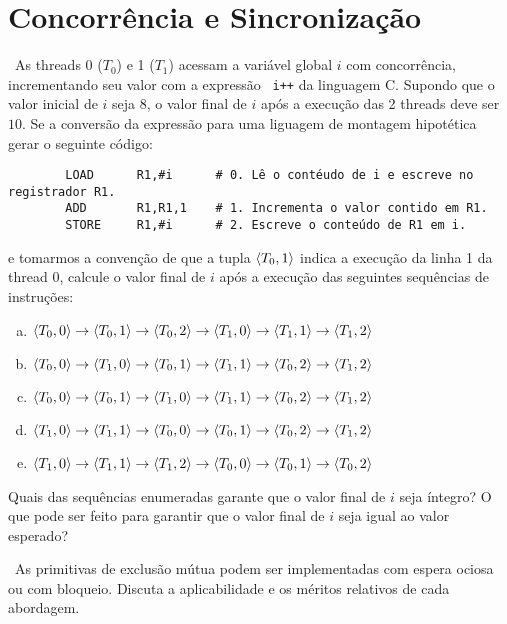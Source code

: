 
\section*{Concorrência e Sincronização}

\exercise~As threads 0 ($T_0$) e 1 ($T_1$) acessam a variável global
$i$ com concorrência, incrementando seu valor com a expressão {\tt
  i++} da linguagem C. Supondo que o valor inicial de $i$ seja $8$, o
valor final de $i$ após a execução das 2 threads deve ser $10$. Se a
conversão da expressão para uma liguagem de montagem hipotética gerar
o seguinte código:

\begin{verbatim}
        LOAD      R1,#i      # 0. Lê o contéudo de i e escreve no registrador R1.
        ADD       R1,R1,1    # 1. Incrementa o valor contido em R1.
        STORE     R1,#i      # 2. Escreve o conteúdo de R1 em i.
\end{verbatim}

\noindent e tomarmos a convenção de que a tupla $\<T_0,1>$ indica
a execução da linha 1 da thread 0, calcule o valor final de $i$ após a
execução das seguintes sequências de instruções:

\begin{enumerate}[a)]
\item $\<T_0,0> \rightarrow \<T_0,1> \rightarrow \<T_0,2>
\rightarrow\<T_1,0>\rightarrow\<T_1,1> \rightarrow\<T_1,2>$
\item $\<T_0,0> \rightarrow\<T_1,0> \rightarrow\<T_0,1>
\rightarrow\<T_1,1>\rightarrow\<T_0,2> \rightarrow\<T_1,2>$
\item $\<T_0,0>\rightarrow\<T_0,1> \rightarrow\<T_1,0>
\rightarrow\<T_1,1>\rightarrow\<T_0,2> \rightarrow\<T_1,2>$
\item $\<T_1,0>\rightarrow\<T_1,1> \rightarrow\<T_0,0>
\rightarrow\<T_0,1>\rightarrow\<T_0,2> \rightarrow\<T_1,2>$
\item $\<T_1,0>\rightarrow\<T_1,1>\rightarrow\<T_1,2>
\rightarrow\<T_0,0>\rightarrow\<T_0,1>\rightarrow\<T_0,2>$
\end{enumerate}

\noindent Quais das sequências enumeradas garante que o valor final de $i$ seja
íntegro? O que pode ser feito para garantir que o valor final de $i$
seja igual ao valor esperado?

\exercise~As primitivas de exclusão mútua podem ser implementadas com
espera ociosa ou com bloqueio. Discuta a aplicabilidade e os méritos
relativos de cada abordagem.

